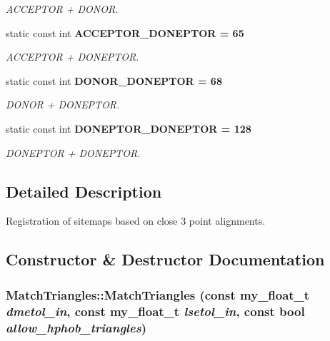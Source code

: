 \begin{CompactItemize}
\begin{CompactList}\small\item\em ACCEPTOR + DONOR. \item\end{CompactList}\item 
static const int \bf{ACCEPTOR\_\-DONEPTOR} = 65\label{classSimSite3D_1_1MatchTriangles_4c4b4779b05e824be2960a0a6ba525f8}

\begin{CompactList}\small\item\em ACCEPTOR + DONEPTOR. \item\end{CompactList}\item 
static const int \bf{DONOR\_\-DONEPTOR} = 68\label{classSimSite3D_1_1MatchTriangles_7816e470f2da8b31bfe68f635a84870f}

\begin{CompactList}\small\item\em DONOR + DONEPTOR. \item\end{CompactList}\item 
static const int \bf{DONEPTOR\_\-DONEPTOR} = 128\label{classSimSite3D_1_1MatchTriangles_152f1eff01e619c50b2361c394330a63}

\begin{CompactList}\small\item\em DONEPTOR + DONEPTOR. \item\end{CompactList}\end{CompactItemize}


\subsection{Detailed Description}
Registration of sitemaps based on close 3 point alignments. 



\subsection{Constructor \& Destructor Documentation}
\subsubsection{\setlength{\rightskip}{0pt plus 5cm}Match\-Triangles::Match\-Triangles (const my\_\-float\_\-t {\em dmetol\_\-in}, const my\_\-float\_\-t {\em lsetol\_\-in}, const bool {\em allow\_\-hphob\_\-triangles})}\label{classSimSite3D_1_1MatchTriangles_29b1ab95b85c05e891ecbdc6700e5926}


